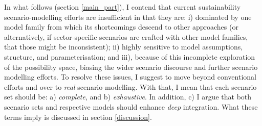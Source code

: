 
In what follows (section \ref{main_part}), I contend that current sustainability scenario-modelling efforts are insufficient in that they are: i) dominated by one model family from which its shortcomings descend to other approaches (or alternatively, if sector-specific scenarios are crafted with other model families, that those might be inconsistent); ii) highly sensitive to model assumptions, structure, and parameterisation; and iii), because of this incomplete exploration of the possibility space, biasing the wider scenario discourse and further scenario modelling efforts. To resolve these issues, I suggest to move beyond conventional efforts and over to \textit{real} scenario-modelling. With that, I mean that each scenario set should be: a) \textit{complete}, and b) \textit{exhaustive}. In addition, c) I argue that both scenario sets and respective models should enhance \textit{deep} integration. What these terms imply is discussed in section \ref{discussion}.






